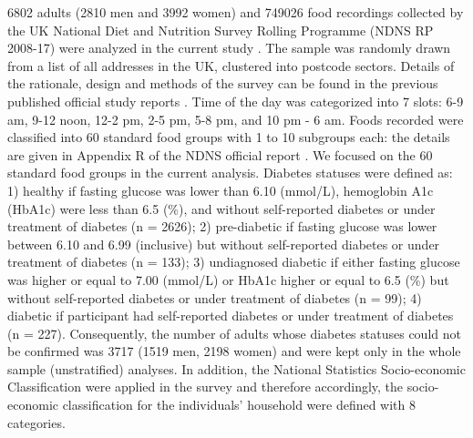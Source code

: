 \documentclass{bmcart}
\begin{document}
6802 adults (2810 men and 3992 women) and 749026 food recordings collected by the UK National Diet and Nutrition Survey Rolling Programme (NDNS RP 2008-17) were analyzed in the current study \cite{MRCElsieWiddowsonLaboratory2018}. The sample was randomly drawn from a list of all addresses in the UK, clustered into postcode sectors. Details of the rationale, design and methods of the survey can be found in the previous published official study reports \cite{bates2014national,roberts2018national}. Time of the day was categorized into 7 slots: 6-9 am, 9-12 noon, 12-2 pm, 2-5 pm, 5-8 pm, and 10 pm - 6 am. Foods recorded were classified into 60 standard food groups with 1 to 10 subgroups each: the details are given in Appendix R of the NDNS official report \cite{NDNSdatabase2018}. We focused on the 60 standard food groups in the current analysis. Diabetes statuses were defined as: 1) healthy if fasting glucose was lower than 6.10 (mmol/L), hemoglobin A1c (HbA1c) were less than 6.5 (\%), and without self-reported diabetes or under treatment of diabetes (n = 2626); 2) pre-diabetic if fasting glucose was lower between 6.10 and 6.99 (inclusive) but without self-reported diabetes or under treatment of diabetes (n = 133); 3) undiagnosed diabetic if either fasting glucose was higher or equal to 7.00 (mmol/L) or HbA1c higher or equal to 6.5 (\%) but without self-reported diabetes or under treatment of diabetes (n = 99); 4) diabetic if participant had self-reported diabetes or under treatment of diabetes (n = 227). Consequently, the number of adults whose diabetes statuses could not be confirmed was 3717 (1519 men, 2198 women) and were kept only in the whole sample (unstratified) analyses. In addition, the National Statistics Socio-economic Classification \cite{rose2005national} were applied in the survey and therefore accordingly, the socio-economic classification for the individuals' household were defined with 8 categories. 
\end{document}
